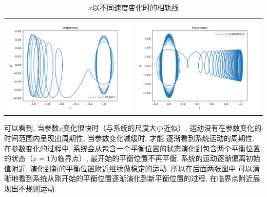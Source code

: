 \documentclass[a4paper,zihao=5,UTF8]{ctexart}
\begin{document}
\begin{table}[htbp]
\begin{tabular}[htbp]{cc}
            \includegraphics[scale=0.5]{2_traj_v=0_015625.png} & \includegraphics[scale=0.5]{2_traj_v=0_00390625.png}
        \end{tabular}
        \caption{$x$以不同速度变化时的相轨线}
        \label{v change}
    \end{table}
    \par 
    可以看到, 当参数$x$变化很快时（与系统的尺度大小近似）,  运动没有在参数变化的时间范围内呈现出周期性, 当参数变化减缓时, 才能
    逐渐看到系统运动的周期性. 在参数变化的过程中, 系统会从包含一个平衡位置的状态演化到包含两个平衡位置的状态（$x=1$为临界点）, 
    最开始的平衡位置不再平衡, 系统的运动逐渐偏离初始值附近, 演化到新的平衡位置附近继续做稳定的运动. 所以在后面两张图中
    可以清晰地看到系统从刚开始的平衡位置逐渐演化到新平衡位置的过程, 在临界点附近展现出不规则运动. 
\end{document}
